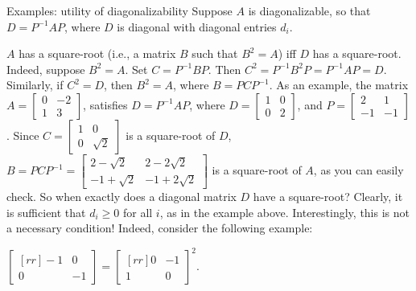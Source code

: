 \begin{frame}{Examples: utility of diagonalizability}
Suppose $A$ is diagonalizable, so that $D=P^{-1}AP$, where $D$ is diagonal with diagonal entries $d_i$. 
\begin{example}
$A$ has a \alert{square-root} (i.e., a matrix $B$ such that $B^2=A$) iff $D$ has a square-root. 
\bpause Indeed, suppose $B^2=A$. Set $C=P^{-1}BP$. Then $C^2=P^{-1}B^2P=P^{-1}AP=D$. Similarly, if $C^2=D$, then $B^2=A$, where $B=PCP^{-1}$. 
\bpause
As an example,  the matrix $A=\begin{bmatrix}
0&-2\\
1 &3
\end{bmatrix}$, satisfies $D=P^{-1}AP$, where $D=\begin{bmatrix}
1&0\\
0&2
\end{bmatrix}$, and $P=\begin{bmatrix}
2&1\\
-1&-1
\end{bmatrix}$. Since $C=\begin{bmatrix}
1&0\\
0&\sqrt{2}
\end{bmatrix}$ is a square-root of $D$, $B=PCP^{-1}=\begin{bmatrix}
2-\sqrt{2}&2-2\sqrt{2}\\
-1+\sqrt{2}&-1+2\sqrt{2}
\end{bmatrix}$ is a square-root of $A$, as you can easily check. 
\bpause
So when exactly does a diagonal matrix $D$ have a square-root? Clearly, it is sufficient that $d_i\geq 0$ for all $i$, as in the example above. Interestingly, this is not a necessary condition! Indeed, consider the following example: 

$
\begin{bmatrix}[rr]
-1&0\\
0&-1
\end{bmatrix}=\begin{bmatrix}[rr]
0&-1\\
1&0
\end{bmatrix}^2.
$ 
\end{example}
\end{frame}


